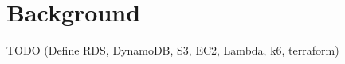 \section{Background}
\label{cha:background}

TODO (Define RDS, DynamoDB, S3, EC2, Lambda, k6, terraform)